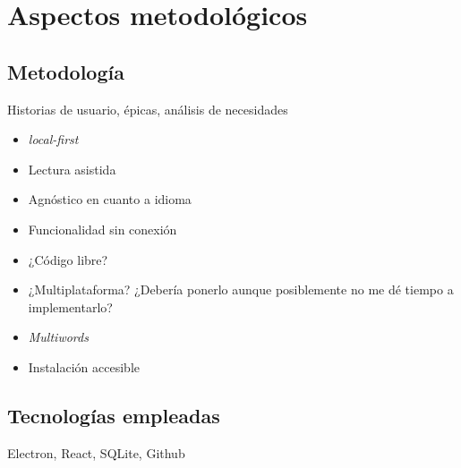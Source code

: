 \chapter{Aspectos metodológicos}  

\section{Metodología}

Historias de usuario, épicas, análisis de necesidades

\begin{itemize}
	\item \textit{local-first}
	\item Lectura asistida
	\item Agnóstico en cuanto a idioma
	\item Funcionalidad sin conexión
	\item ¿Código libre?
	\item ¿Multiplataforma? ¿Debería ponerlo aunque posiblemente no me dé tiempo a implementarlo?
	\item \textit{Multiwords}
	\item Instalación accesible
\end{itemize}

\section{Tecnologías empleadas}

Electron, React, SQLite, Github